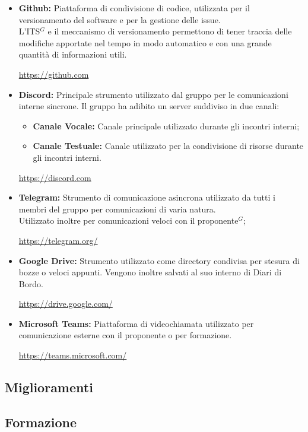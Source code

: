         \begin{itemize}
            \item \textbf{Github:} Piattaforma di condivisione di codice, utilizzata per il versionamento del software e per la gestione delle issue.\\
            L'ITS$^{G}$ e il meccanismo di versionamento permettono di tener traccia delle modifiche apportate nel tempo in modo automatico e con una grande quantità di informazioni utili.
            \begin{center}
                \url{https://github.com}
            \end{center}
            \item \textbf{Discord:} Principale strumento utilizzato dal gruppo per le comunicazioni interne sincrone. 
                Il gruppo ha adibito un server suddiviso in due canali:
                \begin{itemize}
                    \item \textbf{Canale Vocale:} Canale principale utilizzato durante gli incontri interni;
                    \item \textbf{Canale Testuale:} Canale utilizzato per la condivisione di risorse durante gli incontri interni.
                \end{itemize}
                \begin{center}
                    \url{https://discord.com}
                \end{center}
            \item \textbf{Telegram:} Strumento di comunicazione asincrona utilizzato da tutti i membri del gruppo per comunicazioni di varia natura.\\
                    Utilizzato inoltre per comunicazioni veloci con il proponente$^{G}$;
                    \begin{center}
                        \url{https://telegram.org/}
                    \end{center}
            \item \textbf{Google Drive:} Strumento utilizzato come directory condivisa per stesura di bozze o veloci appunti.
            Vengono inoltre salvati al suo interno di Diari di Bordo.
                \begin{center}
                    \url{https://drive.google.com/}
                \end{center}
           \item \textbf{Microsoft Teams:} Piattaforma di videochiamata utilizzato per comunicazione esterne con il proponente o per formazione.
           \begin{center}
            \url{https://teams.microsoft.com/}
           \end{center}
        \end{itemize}
        
        \subsection{Miglioramenti}

        \subsection{Formazione}

        